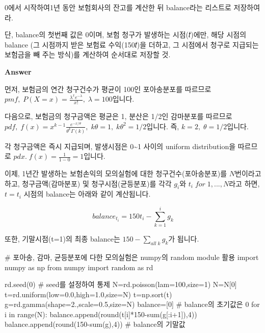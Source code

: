 \documentclass[
  letterpaper,
  DIV=11,
  numbers=noendperiod]{scrreprt}
\newenvironment{Shaded}{\begin{snugshade}}{\end{snugshade}}
\newcommand{\BuiltInTok}[1]{\textcolor[rgb]{0.00,0.23,0.31}{#1}}
\newcommand{\CommentTok}[1]{\textcolor[rgb]{0.37,0.37,0.37}{#1}}
\newcommand{\ControlFlowTok}[1]{\textcolor[rgb]{0.00,0.23,0.31}{#1}}
\newcommand{\DecValTok}[1]{\textcolor[rgb]{0.68,0.00,0.00}{#1}}
\newcommand{\FloatTok}[1]{\textcolor[rgb]{0.68,0.00,0.00}{#1}}
\newcommand{\ImportTok}[1]{\textcolor[rgb]{0.00,0.46,0.62}{#1}}
\newcommand{\KeywordTok}[1]{\textcolor[rgb]{0.00,0.23,0.31}{#1}}
\newcommand{\NormalTok}[1]{\textcolor[rgb]{0.00,0.23,0.31}{#1}}
\newcommand{\OperatorTok}[1]{\textcolor[rgb]{0.37,0.37,0.37}{#1}}
\begin{document}
0에서 시작하여1년 동안 보험회사의 잔고를 계산한 뒤 balance라는 리스트로
저장하여라.

단, balance의 첫번째 값은 0이며, 보험 청구가 발생하는 시점(𝑡)에만, 해당
시점의 balance (그 시점까지 받은 보험료 수익(150𝑡)을 더하고, 그 시점에서
청구로 지급되는 보험금을 빼 주는 방식)를 계산하여 순서대로 저장할 것.

\textbf{Answer}

먼저, 보험금의 연간 청구건수가 평균이 100인 포아송분포를 따르므로
\(pmf,\;P(X=x)=\frac{\lambda^xe^{-\lambda}}{x!},\;\lambda=100\)입니다.

다음으로, 보험금의 청구금액은 평균은 1, 분산은 1/2인 감마분포를 따르므로
\(pdf,\;f(x)=x^{k-1}\frac{e^{-x/\theta}}{\theta^k\Gamma(k)},\;k\theta=1,\;k\theta^2=1/2\)입니다.
즉, \(k=2,\;\theta=1/2\)입니다.

각 청구금액은 즉시 지급되며, 발생시점은 0\textasciitilde1 사이의 uniform
distribution을 따르므로 \(pdx.\;f(x)=\frac{1}{1-0}=1\)입니다.

이제, 1년간 발생하는 보험손익의 모의실험에 대한 청구건수(포아송분포)를
\(N\)번이라고 하고, 청구금액(감마분포) 및 청구시점(균등분포)를 각각
\(g_i\)와 \(t_i\; for\; 1,...,N\)라고 하면, \(t=t_i\) 시점의 balance는
아래와 같이 계산됩니다.

\[{balance}_{t_i}=150t_i-\sum_{k=1}^{i}g_k\]

또한, 기말시점(t=1)의 최종 balance는 \(150-\sum_{all\;k}g_k\)가 됩니다.

\begin{Shaded}
\begin{Highlighting}[]
\CommentTok{\# 포아송, 감마, 균등분포에 다한 모의실험은 numpy의 random module 활용}
\ImportTok{import}\NormalTok{ numpy }\ImportTok{as}\NormalTok{ np}
\ImportTok{from}\NormalTok{ numpy }\ImportTok{import}\NormalTok{ random }\ImportTok{as}\NormalTok{ rd}


\NormalTok{rd.seed(}\DecValTok{0}\NormalTok{) }\CommentTok{\# seed를 설정하여 통제}
\NormalTok{N}\OperatorTok{=}\NormalTok{rd.poisson(lam}\OperatorTok{=}\DecValTok{100}\NormalTok{,size}\OperatorTok{=}\DecValTok{1}\NormalTok{)}
\NormalTok{N}\OperatorTok{=}\NormalTok{N[}\DecValTok{0}\NormalTok{]}
\NormalTok{t}\OperatorTok{=}\NormalTok{rd.uniform(low}\OperatorTok{=}\FloatTok{0.0}\NormalTok{,high}\OperatorTok{=}\FloatTok{1.0}\NormalTok{,size}\OperatorTok{=}\NormalTok{N)}
\NormalTok{t}\OperatorTok{=}\NormalTok{np.sort(t)}
\NormalTok{g}\OperatorTok{=}\NormalTok{rd.gamma(shape}\OperatorTok{=}\FloatTok{2.}\NormalTok{,scale}\OperatorTok{=}\FloatTok{0.5}\NormalTok{,size}\OperatorTok{=}\NormalTok{N)}
\NormalTok{balance}\OperatorTok{=}\NormalTok{[}\DecValTok{0}\NormalTok{] }\CommentTok{\# balance의 초기값은 0}
\ControlFlowTok{for}\NormalTok{ i }\KeywordTok{in} \BuiltInTok{range}\NormalTok{(N):}
\NormalTok{    balance.append(}\BuiltInTok{round}\NormalTok{(t[i]}\OperatorTok{*}\DecValTok{150}\OperatorTok{{-}}\BuiltInTok{sum}\NormalTok{(g[:i}\OperatorTok{+}\DecValTok{1}\NormalTok{]),}\DecValTok{4}\NormalTok{))}
\NormalTok{balance.append(}\BuiltInTok{round}\NormalTok{(}\DecValTok{150}\OperatorTok{{-}}\BuiltInTok{sum}\NormalTok{(g),}\DecValTok{4}\NormalTok{)) }\CommentTok{\# balance의 기말값}
\end{Highlighting}
\end{Shaded}
\end{document}
